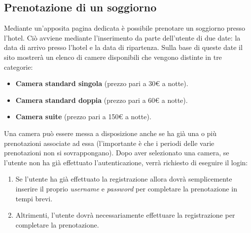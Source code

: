 \documentclass [a4paper, 12pt]{book}
\begin{document}
\subsection{Prenotazione di un soggiorno}
\label{PrenotazioneCamera}
Mediante un'apposita pagina dedicata è possibile prenotare un soggiorno presso l'hotel. Ciò avviene mediante l'inserimento da parte dell'utente di due date: la data di arrivo presso l'hotel e la data di ripartenza. Sulla base di queste date il sito mostrerà un elenco di camere disponibili che vengono distinte in tre categorie:
\begin{itemize}
\item \textbf{Camera standard singola} (prezzo pari a 30€ a notte).
\item \textbf{Camera standard doppia} (prezzo pari a 60€ a notte).
\item \textbf{Camera suite} (prezzo pari a 150€ a notte).
\end{itemize}
Una camera può essere messa a disposizione anche se ha già una o più prenotazioni associate ad essa (l'importante è che i periodi delle varie prenotazioni non si sovrappongano). Dopo aver selezionato una camera, se l'utente non ha già effettuato l'autenticazione, verrà richiesto di eseguire il login:
\begin{enumerate}
\item Se l'utente ha già effettuato la registrazione allora dovrà semplicemente inserire il proprio \textit{username} e \textit{password} per completare la prenotazione in tempi brevi.
\item Altrimenti, l'utente dovrà necessariamente effettuare la registrazione per completare la prenotazione.
\end{enumerate}
\end{document}
